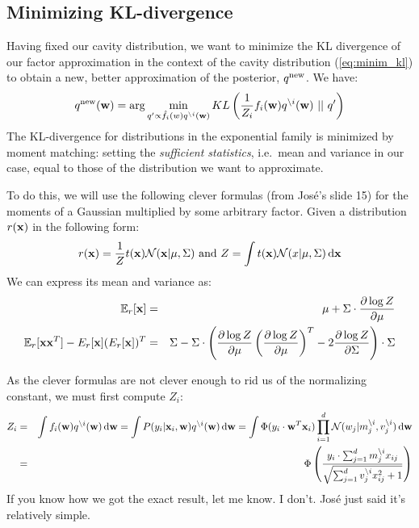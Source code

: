 \documentclass[10pt,a4paper,notitlepage]{article}
\begin{document}
\subsection{Minimizing KL-divergence}

Having fixed our cavity distribution, we want to minimize the KL divergence of our factor approximation in the context of the cavity distribution (\ref{eq:minim_kl}) to obtain a new, better approximation of the posterior, $q^{\mathrm{new}}$. We have:
\begin{equation}\label{eq:minim_kl_pract}
q^{\mathrm{new}}(\mathbf{w}) = \arg \min_{q'\propto \hat{f}_i(w)q^{\setminus i}(\mathbf{w})} KL\left(\frac{1}{Z_i} f_i(\mathbf{w}) q^{\setminus i}(\mathbf{w})\ ||\ q'\right)
\end{equation}
The KL-divergence for distributions in the exponential family is minimized by moment matching: setting the \emph{sufficient statistics}, i.e.\ mean and variance in our case, equal to those of the distribution we want to approximate.

To do this, we will use the following clever formulas (from José's slide 15) for the moments of a Gaussian multiplied by some arbitrary factor. Given a distribution $r(\mathbf{x})$ in the following form:
\begin{equation}
r(\mathbf{x}) = \frac{1}{Z} t(\mathbf{x}) \mathcal{N}(\mathbf{x}|\mu,\Sigma)\mbox{ and }Z = \int t(\mathbf{x}) \mathcal{N}(x|\mu, \Sigma) \,\mathrm{d} \mathbf{x}
\end{equation}
We can express its mean and variance as:
\begin{eqnarray} \label{eq:clever_mean}
\mathbb{E}_r[\mathbf{x}] & = & \mu + \Sigma\cdot\frac{\partial \log Z}{\partial \mu} \\ \label{eq:clever_variance}
\mathbb{E}_r[\mathbf{x}\mathbf{x}^T] - E_r[\mathbf{x}](E_r[\mathbf{x}])^T& = & \Sigma - \Sigma\cdot \left(\frac{\partial \log Z}{\partial \mu} \left(\frac{\partial \log Z}{\partial \mu}\right)^T - 2\frac{\partial \log Z}{\partial \Sigma} \right)\cdot \Sigma
\end{eqnarray}

As the clever formulas are not clever enough to rid us of the normalizing constant, we must first compute $Z_i$:
\begin{eqnarray}
Z_i & = & \int f_i(\mathbf{w}) q^{\setminus i}(\mathbf{w})\,\mathrm{d} \mathbf{w} = \int P(y_i|\mathbf{x}_i, \mathbf{w}) q^{\setminus i}(\mathbf{w})\,\mathrm{d}\mathbf{w} = \int \Phi(y_i\cdot \mathbf{w}^T \mathbf{x}_i) \prod_{i=1}^d\mathcal{N}(w_j|m_j^{\setminus i},v_j^{\setminus i}) \,\mathrm{d}\mathbf{w} \\ \label{eq:zi}
& = & \Phi\left( \frac{y_i\cdot \sum_{j=1}^d m_j^{\setminus i} x_{ij} }{\sqrt{\sum_{j=1}^d v_j^{\setminus i}x_{ij}^2 + 1}} \right)
\end{eqnarray}
If you know how we got the exact result, let me know. I don't. José just said it's relatively simple.
\end{document}
